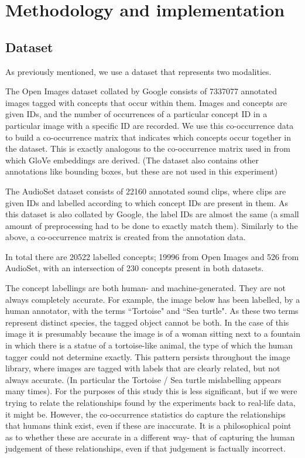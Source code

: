 
\chapter{Methodology and implementation}


\section{Dataset}

As previously mentioned, we use a dataset that represents two modalities. 

The Open Images dataset collated by Google\cite{openimages}  consists of 7337077 annotated images tagged with concepts that occur within them. Images and concepts are given IDs, and the number of occurrences of a particular concept ID in a particular image with a specific ID are recorded. We use this co-occurrence data to build a co-occurrence matrix that indicates which concepts occur together in the dataset. This is exactly analogous to the co-occurrence matrix used in \cite{pennington2014glove} from which GloVe embeddings are derived. (The dataset also contains other annotations like bounding boxes, but these are not used in this experiment)

The AudioSet dataset \cite{audioset} consists of 22160 annotated sound clips, where clips are given IDs and labelled according to which concept IDs are present in them. As this dataset is also collated by Google, the label IDs are almost the same (a small amount of preprocessing had to be done to exactly match them). Similarly to the above, a co-occurrence matrix is created from the annotation data. 

In total there are 20522 labelled concepts; 19996 from Open Images and 526 from AudioSet, with an intersection of 230 concepts present in both datasets. 

The concept labellings are both human- and machine-generated. They are not always completely accurate. For example, the image below has been labelled, by a human annotator, with the terms ``Tortoise" and ``Sea turtle". As these two terms represent distinct species, the tagged object cannot be both. In the case of this image it is presumably because the image is of a woman sitting next to a fountain in which there is a statue of a tortoise-like animal, the type of which the human tagger could not determine exactly. This pattern persists throughout the image library, where images are tagged with labels that are clearly related, but not always accurate. (In particular the Tortoise / Sea turtle mislabelling appears many times). For the purposes of this study this is less significant, but if we were trying to relate the relationships found by the experiments back to real-life data, it might be. However, the co-occurrence statistics do capture the relationships that humans think exist, even if these are inaccurate. It is a philosophical point as to whether these are accurate in a different way- that of capturing the human judgement of these relationships, even if that judgement is factually incorrect.   

